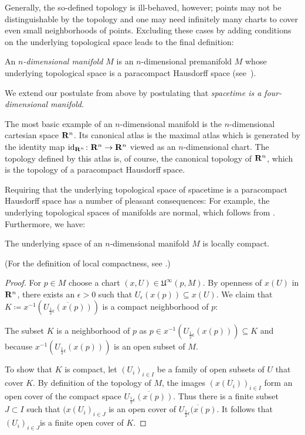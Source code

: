 Generally, the so-defined topology is ill-behaved, however;
points may not be distinguishable by the topology and one may need infinitely
many charts to cover even small neighborhoods of points. Excluding these cases
by adding conditions on the underlying topological space leads to the final definition:
\begin{dfn}
  An \emph{$n$-dimensional manifold $M$} is an $n$-dimensional premanifold $M$
  whose underlying topological space is a paracompact Hausdorff space
  (see~).
\end{dfn}
We extend our postulate from above by postulating that \emph{spacetime is a
four-dimensional manifold}.

The most basic example of an $n$-dimensional manifold is the $n$-dimensional 
cartesian space $\mathbf{R}^n$. Its canonical atlas is the maximal atlas which is generated
by the identity map $\mathrm{id}_{\mathbf{R}^n}\colon \mathbf{R}^n \to \mathbf{R}^n$ viewed
as an $n$-dimensional chart. The topology defined by this atlas is, of course,
the canonical topology of $\mathbf{R}^n$, which is the topology of a paracompact
Hausdorff space.

Requiring that the underlying topological space of spacetime is a paracompact
Hausdorff space has a number of pleasant consequences: For example, the underlying
topological spaces of manifolds are normal, which follows from .
Furthermore, we have:
\begin{prop}
  The underlying space of an $n$-dimensional manifold $M$ is locally compact.
\end{prop}
(For the definition of local compactness, see .)

\begin{proof}
  For $p \in M$ choose a chart $(x, U) \in \mathfrak U^\infty(p, M)$. By openness
  of $x(U)$ in $\mathbf{R}^n$, there exists an $\epsilon > 0$ such that $U_\epsilon(x(p))
  \subseteq x(U)$. We claim that $K \coloneqq x^{-1}(\overline{U_{\frac 1 2 \epsilon}(x(p))})$
  is a compact neighborhood of $p$:
  
  The subset $K$ is a neighborhood of $p$ as
  $p \in x^{-1}(U_{\frac 1 2 \epsilon}(x(p))) \subseteq K$ and
  because $x^{-1}(U_{\frac 1 2 \epsilon}(x(p)))$ is an open subset of $M$.

  To show that $K$ is compact, let $(U_i)_{i \in I}$ be a family of open subsets
  of $U$ that cover $K$. By definition of the topology of $M$, the images $(x(U_i))_{i \in I}$
  form an open cover of the compact space $\overline{U_{\frac 1 2 \epsilon}(x(p))}$.
  Thus there is a finite subset $J \subset I$ such that $(x(U_i)_{i \in J}$ is
  an open cover of $\overline{U_{\frac 1 2 \epsilon}(x(p)}$. It follows that
  $(U_i)_{i \in J}$is a finite open cover of $K$.
\end{proof}

